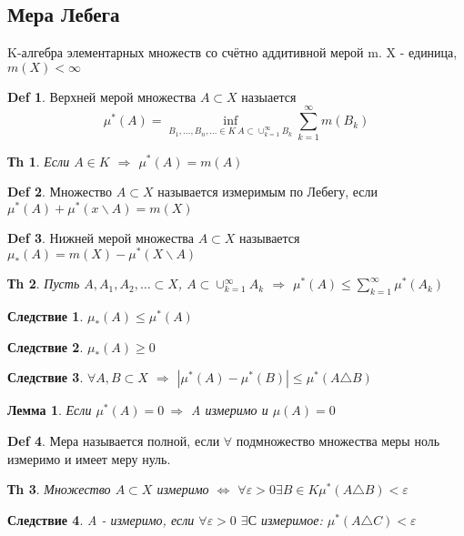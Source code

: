 \documentclass[14pt]{article}
\theoremstyle{plain}
\newtheorem{Thm}{Тh}
\newtheorem{Lem}{Лемма}
\newtheorem{Sled}{Следствие}
\theoremstyle{definition}
\newtheorem{Def}{Def}
\begin{document}
	\subsection{Мера Лебега}
		 K-алгебра элементарных множеств со счётно аддитивной мерой m. X - единица, $m(X) < \infty$
		 \begin{Def}
			Верхней мерой множества $A \subset X$ назыается
			$$
				\mu^{*}(A) = \inf\limits_{B_1, \dots, B_n, \dots \in K \ A \subset \cup_{k=1}^{\infty} B_k} \sum\limits_{k=1}^{\infty} m(B_k)
			$$
		 \end{Def}
	     \begin{Thm}
			Если $A \in K$ $\Rightarrow$ $\mu^{*}(A) = m(A)$
		\end{Thm}
		 \begin{Def}
			Множество $A \subset X$ называется измеримым по Лебегу, если $\mu^*(A) + \mu^*( x \backslash A) = m(X)$
		\end{Def}
		\begin{Def}
			Нижней мерой множества $A \subset X$ называется $\mu_*(A) = m(X) - \mu^*(X \backslash A)$
		\end{Def}
		\begin{Thm}
			Пусть $A, A_1, A_2, \dots \subset X$, $A \subset \cup_{k=1}^{\infty} A_k$ $\Rightarrow$ $\mu^*(A) \leq \sum\limits_{k=1}^{\infty} \mu^*(A_k)$
		\end{Thm}
		\begin{Sled}
			$\mu_*(A) \leq \mu^*(A)$
		\end{Sled}
		\begin{Sled}
			$\mu_*(A) \geq 0$
		\end{Sled}
		\begin{Sled}
			$\forall A,B \subset X$ $\Rightarrow$ $|\mu^*(A) - \mu^*(B)| \leq \mu^*(A \triangle B)$
		\end{Sled}
		\begin{Lem}
			Если $\mu^{*}(A) = 0 \ \Rightarrow$ A измеримо и $\mu(A) = 0$ 
		\end{Lem}
		\begin{Def}
			Мера называется полной, если $\forall$ подмножество множества меры ноль измеримо и имеет меру нуль.
		\end{Def}
		\begin{Thm}
			Множество $A \subset X$ измеримо $\Leftrightarrow$ $\forall \varepsilon > 0 \exists B \in K \mu^*(A \triangle B) < \varepsilon$
		\end{Thm}
		\begin{Sled}
			A - измеримо, если $\forall \varepsilon > 0$ $\exists С$ измеримое: $\mu^*(A \triangle C) < \varepsilon$
		\end{Sled}
\end{document}
